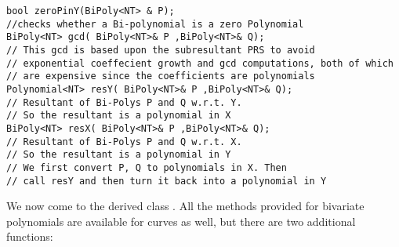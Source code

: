 \begin{progb}{
\> \tt bool zeroPinY(BiPoly<NT> \& P);\\
\> \> //checks whether a Bi-polynomial is a zero Polynomial\\
\> \tt BiPoly<NT> gcd( BiPoly<NT>\& P ,BiPoly<NT>\& Q);\\
\> \> //   This gcd is based upon the subresultant PRS to avoid\\
\> \> //   exponential coeffecient growth and gcd computations, both of which \\
\> \> //   are expensive since the coefficients are polynomials\\
\> \tt Polynomial<NT>  resY( BiPoly<NT>\& P ,BiPoly<NT>\& Q);\\
\> \> //      Resultant of Bi-Polys P and Q w.r.t. Y.\\
\> \> //      So the resultant is a polynomial in X\\
\> \tt BiPoly<NT>  resX( BiPoly<NT>\& P ,BiPoly<NT>\& Q);\\
\> \> //      Resultant of Bi-Polys P and Q w.r.t. X.\\
\> \>//      So the resultant is a polynomial in Y\\
\> \>//	We first convert P, Q to polynomials in X. Then \\
\> \>// 	call resY and then turn it back into a polynomial in Y\\
}\end{progb}



We now come to the derived class \Curve.  All the methods
provided for bivariate polynomials are available for curves as well,
but there are two additional functions:

